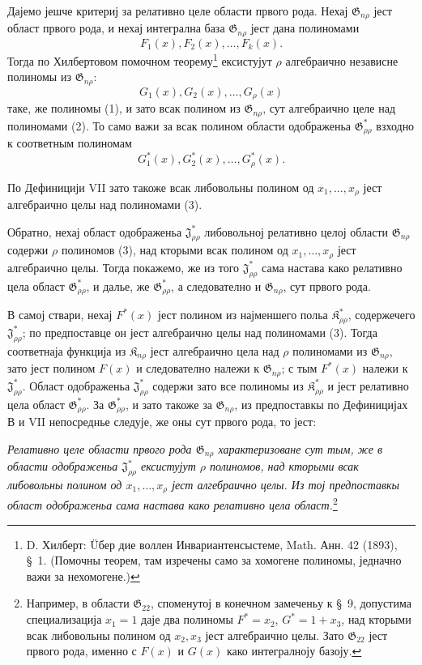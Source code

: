 ﻿\documentclass[11pt]{article}
\providecommand{\Kfield}{\mathfrak{K}}
\providecommand{\Jdom}{\mathfrak{J}}
\providecommand{\Gdom}{\mathfrak{G}}
\begin{document}
Дајемо јешче критериј за релативно целе области првого рода. Нехај $\Gdom_{n\rho}$ јест област првого рода, и нехај интегрална база $\Gdom_{n\rho}$ јест дана полиномами
\begin{equation}
  F_1(x),F_2(x),\ldots,F_k(x).
\tag{1}
\end{equation}
Тогда по Хилбертовом помочном теорему\footnote{D. Хилберт: Üбер дие воллен Инвариантенсыстеме, Math. Анн. 42 (1893), \S\ 1. (Помочны теорем, там изречены само за хомогене полиномы, једначно важи за нехомогене.)} ексистујут $\rho$ алгебраично независне полиномы из $\Gdom_{n\rho}$:
\begin{equation}
  G_1(x),G_2(x),\ldots,G_\rho(x)
\tag{2}
\end{equation}
таке, же полиномы (1), и зато всак полином из $\Gdom_{n\rho}$, сут алгебраично целе над полиномами (2). То само важи за всак полином области одображеньа $\Gdom^*_{\rho\rho}$ взходно к соответным полиномам
\begin{equation}
  G_1^*(x),G_2^*(x),\ldots,G_\rho^*(x).
\tag{3}
\end{equation}

По Дефиницији VII зато такоже всак либовольны полином од $x_1,\ldots,x_\rho$ јест алгебраично целы над полиномами (3).

Обратно, нехај област одображеньа $\Jdom^*_{\rho\rho}$ либовольној релативно целој области $\Gdom_{n\rho}$ содержи $\rho$ полиномов (3), над кторыми всак полином од $x_1,\ldots,x_\rho$ јест алгебраично целы. Тогда покажемо, же из того $\Jdom^*_{\rho\rho}$ сама настава како релативно цела област $\Gdom^*_{\rho\rho}$, и далье, же $\Gdom^*_{\rho\rho}$, а следователно и $\Gdom_{n\rho}$, сут првого рода.

В самој ствари, нехај $F^*(x)$ јест полином из најменшего польа $\Kfield^*_{\rho\rho}$, содержечего $\Jdom^*_{\rho\rho}$; по предпоставце он јест алгебраично целы над полиномами (3). Тогда соответнаја функција из $\Kfield_{n\rho}$ јест алгебраично цела над $\rho$ полиномами из $\Gdom_{n\rho}$, зато јест полином $F(x)$ и следователно належи к $\Gdom_{n\rho}$; с тым $F^*(x)$ належи к $\Jdom^*_{\rho\rho}$. Област одображеньа $\Jdom^*_{\rho\rho}$ содержи зато все полиномы из $\Kfield^*_{\rho\rho}$ и јест релативно цела област $\Gdom^*_{\rho\rho}$. За $\Gdom^*_{\rho\rho}$, и зато такоже за $\Gdom_{n\rho}$, из предпоставкы по Дефиницијах В и VII непосреднье следује, же оны сут првого рода, то јест:

{\itshape Релативно целе области првого рода $\Gdom_{n\rho}$ характеризоване сут тым, же в области одображеньа $\Jdom^*_{\rho\rho}$ ексистујут $\rho$ полиномов, над кторыми всак либовольны полином од $x_1,\ldots,x_\rho$ јест алгебраично целы. Из тој предпоставкы област одображеньа сама настава како релативно цела област.}\footnote{Например, в области $\Gdom_{22}$, споменутој в конечном замеченьу к \S\ 9, допустима специализација $x_1=1$ даје два полиномы $F^*=x_2$, $G^*=1+x_3$, над кторыми всак либовольны полином од $x_2,x_3$ јест алгебраично целы. Зато $\Gdom_{22}$ јест првого рода, именно с $F(x)$ и $G(x)$ како интегралноју базоју.}
\end{document}
